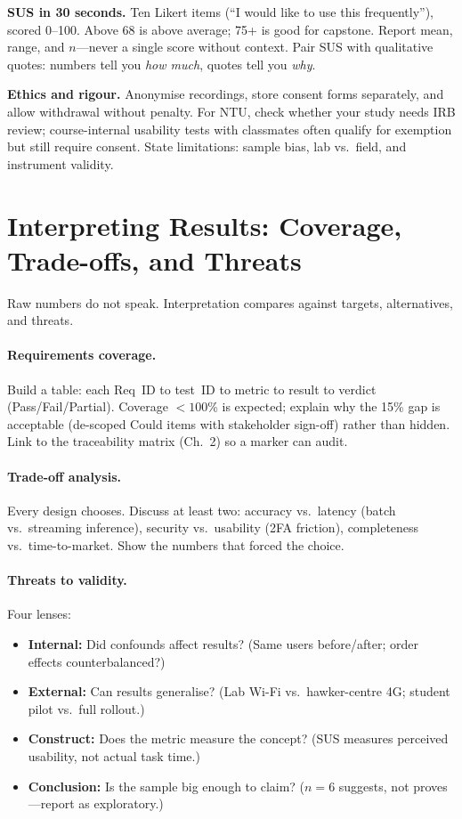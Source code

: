 \textbf{SUS in 30 seconds.} Ten Likert items (``I would like to use this frequently''), scored 0--100. Above 68 is above average; 75+ is good for capstone. Report mean, range, and $n$---never a single score without context. Pair SUS with qualitative quotes: numbers tell you \emph{how much}, quotes tell you \emph{why}.

\textbf{Ethics and rigour.} Anonymise recordings, store consent forms separately, and allow withdrawal without penalty. For NTU, check whether your study needs IRB review; course-internal usability tests with classmates often qualify for exemption but still require consent. State limitations: sample bias, lab vs.\ field, and instrument validity.

\section{Interpreting Results: Coverage, Trade-offs, and Threats}
\label{sec:interpreting}

Raw numbers do not speak. Interpretation compares against targets, alternatives, and threats.

{\sloppy \paragraph{Requirements coverage.} Build a table: each Req~ID to test~ID to
metric to result to verdict (Pass/Fail/Partial). Coverage $<100$\% is expected;
explain why the 15\% gap is acceptable (de-scoped Could items with stakeholder
sign-off) rather than hidden. Link to the traceability matrix (Ch.~2) so a marker can audit.\par}

\paragraph{Trade-off analysis.} Every design chooses. Discuss at least two: accuracy vs.\ latency (batch vs.\ streaming inference), security vs.\ usability (2FA friction), completeness vs.\ time-to-market. Show the numbers that forced the choice.

\paragraph{Threats to validity.} Four lenses:
\begin{itemize}
    \item \textbf{Internal:} Did confounds affect results? (Same users before/after; order effects counterbalanced?)
    \item \textbf{External:} Can results generalise? (Lab Wi-Fi vs.\ hawker-centre 4G; student pilot vs.\ full rollout.)
    \item \textbf{Construct:} Does the metric measure the concept? (SUS measures perceived usability, not actual task time.)
    \item \textbf{Conclusion:} Is the sample big enough to claim? ($n=6$ suggests, not proves---report as exploratory.)
\end{itemize}

